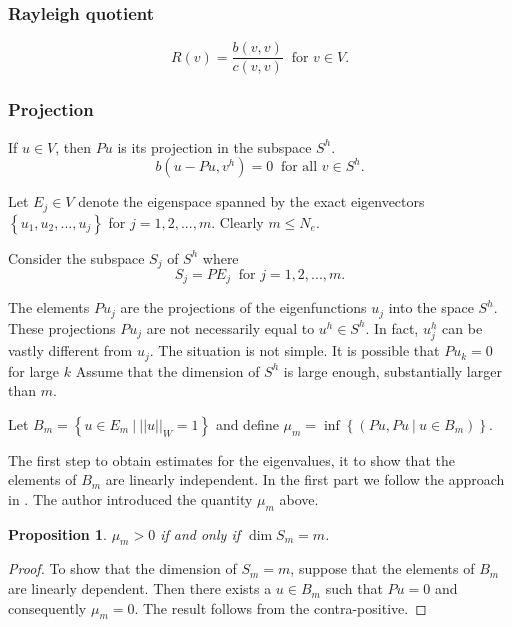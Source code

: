 \documentclass[../../main.tex]{subfiles}
\begin{document}
\subsubsection*{Rayleigh quotient}
\begin{equation}
	R(v) = \frac{b(v,v)}{c(v,v)} \ \text { for } v \in V. \label{Rayleigh}
\end{equation} \label{sym:Rayleigh}

\subsubsection*{Projection}
If $u \in V$, then $Pu$ is its projection in the subspace $S^h$.
\begin{equation*}
	b(u-Pu,v^h) = 0 \ \text{ for all } v \in S^h.
\end{equation*}

Let $E_j \in V$ denote the eigenspace spanned by the exact eigenvectors $\left\{u_1,u_2,...,u_j \right\}$ for $j = 1,2,...,m$. Clearly $m \leq N_e$.

Consider the subspace $S_j$ of $S^h$ where
\begin{equation*}
	S_j = PE_j \ \text{ for } j = 1,2,...,m.
\end{equation*} 

The elements $Pu_j$ are the projections of the eigenfunctions $u_j$ into the space $S^h$. These projections $Pu_j$ are not necessarily equal to $u^h \in S^h$. In fact, $u^h_j$  can be vastly different from $u_j$. The situation is not simple. It is possible that $Pu_k = 0$ for large $k$ Assume that the dimension of $S^h$ is large enough, substantially larger than $m$.

Let $B_m = \left\{u \in E_m \ | \ ||u||_{W} = 1 \right\}$ and define $\mu_m = \inf\left\{(Pu,Pu \ | \ u \in B_m)\right\}$.

The first step to obtain estimates for the eigenvalues, it to show that the elements of $B_m$ are linearly independent. In the first part we follow the approach in \cite{Zie2000}. The author introduced the quantity $\mu_m$ above.

\newtheorem{Prop_1}{Proposition}
\begin{Prop_1}
 $\mu_{m} > 0$ if and only if $\dim S_{m} = m$. \label{sym:mu}
\end{Prop_1}
\begin{proof}
	To show that the dimension of $S_m = m$, suppose that the elements of $B_m$ are linearly dependent. Then there exists a $u \in B_m$ such that $Pu = 0$ and consequently $\mu_m = 0$. The result follows from the contra-positive.
\end{proof}
\end{document}
